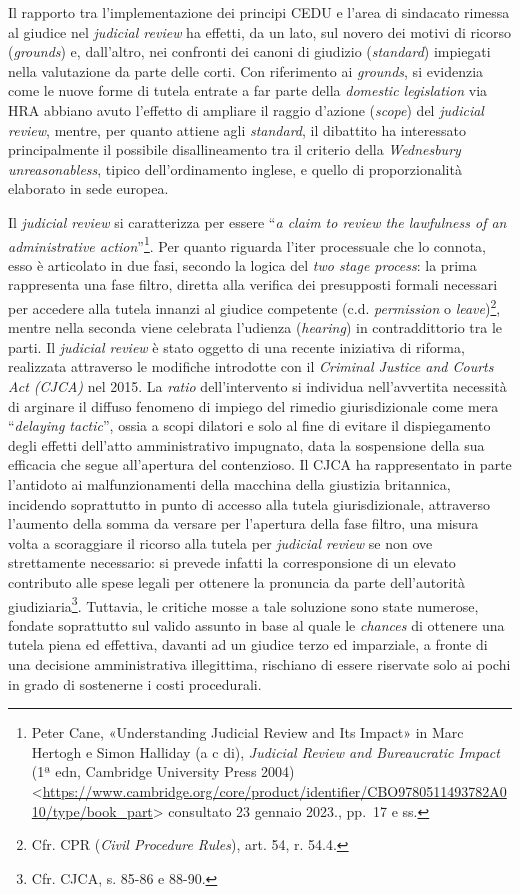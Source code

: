 \documentclass[12pt,it,a4paper,]{report}
\begin{document}
Il rapporto tra l'implementazione dei principi CEDU e l'area di
sindacato rimessa al giudice nel \emph{judicial review} ha effetti, da
un lato, sul novero dei motivi di ricorso (\emph{grounds}) e,
dall'altro, nei confronti dei canoni di giudizio (\emph{standard})
impiegati nella valutazione da parte delle corti. Con riferimento ai
\emph{grounds}, si evidenzia come le nuove forme di tutela entrate a far
parte della \emph{domestic legislation} via HRA abbiano avuto l'effetto
di ampliare il raggio d'azione (\emph{scope}) del \emph{judicial
review}, mentre, per quanto attiene agli \emph{standard}, il dibattito
ha interessato principalmente il possibile disallineamento tra il
criterio della \emph{Wednesbury unreasonabless}, tipico dell'ordinamento
inglese, e quello di proporzionalità elaborato in sede europea.

Il \emph{judicial review} si caratterizza per essere ``\emph{a claim to
review the lawfulness of an administrative action}''\footnote{{Peter
  Cane, {«Understanding Judicial Review and Its Impact»} in Marc Hertogh
  e Simon Halliday (a c di), \emph{Judicial {Review} and {Bureaucratic
  Impact}} (1ª edn, {Cambridge University Press} 2004)
  \textless{}\url{https://www.cambridge.org/core/product/identifier/CBO9780511493782A010/type/book_part}\textgreater{}
  consultato 23 gennaio 2023.}, pp.~17 e ss.}. Per quanto riguarda
l'iter processuale che lo connota, esso è articolato in due fasi,
secondo la logica del \emph{two stage process}: la prima rappresenta una
fase filtro, diretta alla verifica dei presupposti formali necessari per
accedere alla tutela innanzi al giudice competente (c.d.
\emph{permission} o \emph{leave})\footnote{Cfr. CPR (\emph{Civil
  Procedure Rules}), art. 54, r. 54.4.}, mentre nella seconda viene
celebrata l'udienza (\emph{hearing}) in contraddittorio tra le parti. Il
\emph{judicial review} è stato oggetto di una recente iniziativa di
riforma, realizzata attraverso le modifiche introdotte con il
\emph{Criminal Justice and Courts Act (CJCA)} nel 2015. La \emph{ratio}
dell'intervento si individua nell'avvertita necessità di arginare il
diffuso fenomeno di impiego del rimedio giurisdizionale come mera
``\emph{delaying tactic}'', ossia a scopi dilatori e solo al fine di
evitare il dispiegamento degli effetti dell'atto amministrativo
impugnato, data la sospensione della sua efficacia che segue
all'apertura del contenzioso. Il CJCA ha rappresentato in parte
l'antidoto ai malfunzionamenti della macchina della giustizia
britannica, incidendo soprattutto in punto di accesso alla tutela
giurisdizionale, attraverso l'aumento della somma da versare per
l'apertura della fase filtro, una misura volta a scoraggiare il ricorso
alla tutela per \emph{judicial review} se non ove strettamente
necessario: si prevede infatti la corresponsione di un elevato
contributo alle spese legali per ottenere la pronuncia da parte
dell'autorità giudiziaria\footnote{Cfr. CJCA, s. 85-86 e 88-90.}.
Tuttavia, le critiche mosse a tale soluzione sono state numerose,
fondate soprattutto sul valido assunto in base al quale le
\emph{chances} di ottenere una tutela piena ed effettiva, davanti ad un
giudice terzo ed imparziale, a fronte di una decisione amministrativa
illegittima, rischiano di essere riservate solo ai pochi in grado di
sostenerne i costi procedurali.
\end{document}
